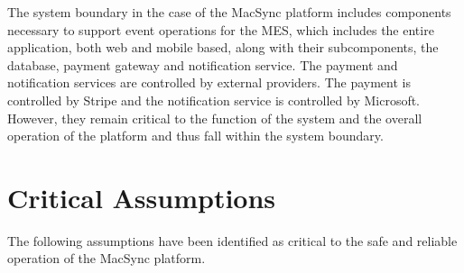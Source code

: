 \documentclass{article}
\begin{document}
The system boundary in the case of the MacSync platform includes components necessary to support event operations for the MES, which includes the entire application, both web and mobile based, along with their subcomponents, the database, payment gateway and notification service. The payment and notification services are controlled by external providers. The payment is controlled by Stripe and the notification service is controlled by Microsoft. However, they remain critical to the function of the system and the overall operation of the platform and thus fall within the system boundary.

\section{Critical Assumptions}

The following assumptions have been identified as critical to the safe and reliable operation of the MacSync platform.
\end{document}
